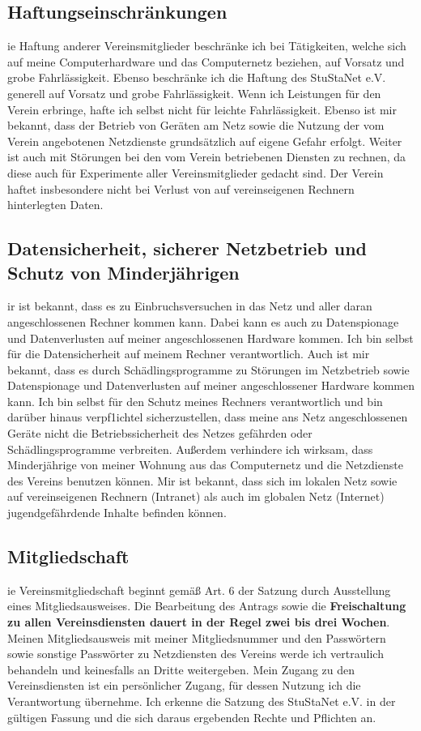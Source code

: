 \documentclass[a4paper,14pt]{scrartcl}
\begin{document}
\subsection*{Haftungseinschränkungen}
ie Haftung anderer Vereinsmitglieder beschränke ich bei Tätigkeiten, welche sich auf meine Computerhardware und das Computernetz beziehen, auf Vorsatz und grobe Fahrlässigkeit. Ebenso beschränke ich die Haftung des StuStaNet e.V. generell auf Vorsatz und grobe Fahrlässigkeit. Wenn ich Leistungen für den Verein erbringe, hafte ich selbst nicht für leichte Fahrlässigkeit. Ebenso ist mir bekannt, dass der Betrieb von Geräten am Netz sowie die Nutzung der vom Verein angebotenen Netzdienste grundsätzlich auf eigene Gefahr erfolgt. Weiter ist auch mit Störungen bei den vom Verein betriebenen Diensten zu rechnen, da diese auch für Experimente aller Vereinsmitglieder gedacht sind. Der Verein haftet insbesondere nicht bei Verlust von auf vereinseigenen Rechnern hinterlegten Daten.

\subsection*{Datensicherheit, sicherer Netzbetrieb und Schutz von Minderjährigen}
ir ist bekannt, dass es zu Einbruchsversuchen in das Netz und aller daran angeschlossenen Rechner kommen kann. Dabei kann es auch zu Datenspionage und Datenverlusten auf meiner angeschlossenen Hardware kommen. Ich bin selbst für die Datensicherheit auf meinem Rechner verantwortlich. Auch ist mir bekannt, dass es durch Schädlingsprogramme zu Störungen im Netzbetrieb sowie Datenspionage und Datenverlusten auf meiner angeschlossener Hardware kommen kann. Ich bin selbst für den Schutz meines Rechners verantwortlich und bin darüber hinaus verpf1ichtel sicherzustellen, dass meine ans Netz angeschlossenen Geräte nicht die Betriebssicherheit des Netzes gefährden oder Schädlingsprogramme verbreiten. Außerdem verhindere ich wirksam, dass Minderjährige von meiner Wohnung aus das Computernetz und die Netzdienste des Vereins benutzen können. Mir ist bekannt, dass sich im lokalen Netz sowie auf vereinseigenen Rechnern (Intranet) als auch im globalen Netz (Internet) jugendgefährdende Inhalte befinden können.

\subsection*{Mitgliedschaft}
ie Vereinsmitgliedschaft beginnt gemäß Art. 6 der Satzung durch Ausstellung eines Mitgliedsausweises. Die Bearbeitung des Antrags sowie die \textbf{Freischaltung zu allen Vereinsdiensten dauert in der Regel zwei bis drei Wochen}. Meinen Mitgliedsausweis mit meiner Mitgliedsnummer und den Passwörtern sowie sonstige Passwörter zu Netzdiensten des Vereins werde ich vertraulich behandeln und keinesfalls an Dritte weitergeben. Mein Zugang zu den Vereinsdiensten ist ein persönlicher Zugang, für dessen Nutzung ich die Verantwortung übernehme. Ich erkenne die Satzung des StuStaNet e.V. in der gültigen Fassung und die sich daraus ergebenden Rechte und Pflichten an.
\end{document}
